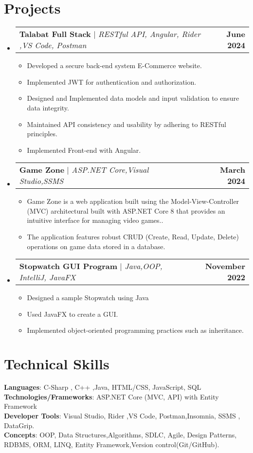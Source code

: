 \documentclass[letterpaper,11pt]{article}
\makeatletter
\newcommand{\resumeItem}[1]{
  \item\small{
    {#1 \vspace{-2pt}}
  }
}
\newcommand{\resumeProjectHeading}[2]{
    \item
    \begin{tabular*}{1.001\textwidth}{l@{\extracolsep{\fill}}r}
      \small#1 & \textbf{\small #2}\\
    \end{tabular*}\vspace{-7pt}
}
\newcommand{\resumeSubHeadingListStart}{\begin{itemize}[leftmargin=0.0in, label={}]}
\newcommand{\resumeSubHeadingListEnd}{\end{itemize}}
\newcommand{\resumeItemListStart}{\begin{itemize}}
\newcommand{\resumeItemListEnd}{\end{itemize}\vspace{-5pt}}
\makeatother
\begin{document}
\section{Projects}
    \vspace{-5pt}
    \resumeSubHeadingListStart
      \resumeProjectHeading
          {\textbf{Talabat Full Stack} $|$ \emph{RESTful API, Angular, Rider ,VS Code, Postman}}{June 2024}
          \resumeItemListStart
            \resumeItem{ Developed a secure back-end system E-Commerce website.}
            \resumeItem{Implemented JWT for authentication and authorization.}
            \resumeItem{Designed and Implemented data models and input validation to ensure data integrity.}
            \resumeItem{Maintained API consistency and usability by adhering to RESTful principles.}
                    \resumeItem{Implemented Front-end with Angular.}
          \resumeItemListEnd
          \vspace{-13pt}
      \resumeProjectHeading
          {\textbf{Game Zone} $|$ \emph{ASP.NET Core,Visual Studio,SSMS}}{March 2024}
          \resumeItemListStart
            \resumeItem{Game Zone is a web application built using the Model-View-Controller (MVC) architectural
 built with ASP.NET Core 8 that provides an intuitive interface for managing video games..}
            \resumeItem{ The application features robust CRUD (Create, Read, Update, Delete) operations on game data stored in a database.}
          \resumeItemListEnd 
          \vspace{-13pt}
          \resumeProjectHeading
          {\textbf{Stopwatch GUI Program} $|$ \emph{Java,OOP, IntelliJ, JavaFX}}{November  2022}
          \resumeItemListStart
            \resumeItem{Designed a sample Stopwatch using Java}
            \resumeItem{Used JavaFX to create a GUI.}
            \resumeItem{Implemented object-oriented programming practices such as inheritance.}
          \resumeItemListEnd 
    \resumeSubHeadingListEnd
\vspace{-15pt}


%
\section{Technical Skills}
 \begin{itemize}[leftmargin=0.15in, label={}]
    \small{\item{
     \textbf{Languages}{: C-Sharp , C++ ,Java, HTML/CSS, JavaScript, SQL} \\
\textbf{Technologies/Frameworks}{: ASP.NET Core (MVC, API) with Entity Framework} \\
\textbf{Developer Tools}{: Visual Studio, Rider ,VS Code, Postman,Insomnia, SSMS , DataGrip.}     \\
         \textbf{Concepts}{: OOP, Data Structures,Algorithms, SDLC, Agile, Design Patterns, RDBMS, ORM, LINQ, Entity Framework,Version control(Git/GitHub).}
}}
 \end{itemize}
 \vspace{-16pt}
\end{document}
